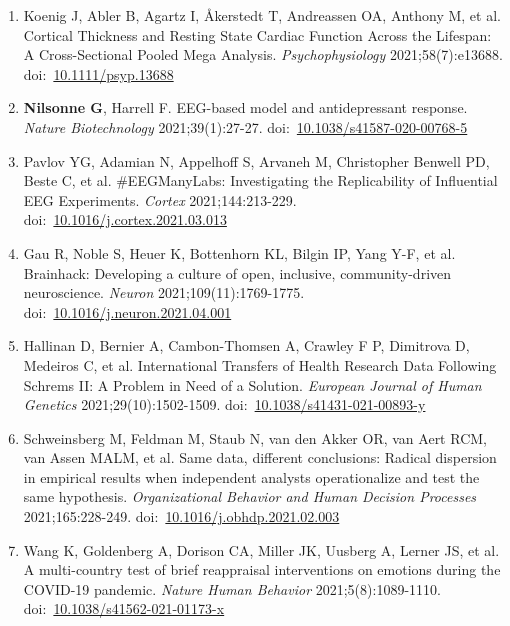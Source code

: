 \documentclass[11pt,a4paper]{article}
\begin{document}
\begin{enumerate}
\item Koenig J, Abler B, Agartz I, Åkerstedt T, Andreassen OA, Anthony M, et al. Cortical Thickness and Resting State Cardiac Function Across the Lifespan: A Cross-Sectional Pooled Mega Analysis. \textit{Psychophysiology} 2021;58(7):e13688. doi:~\href{https://doi.org/10.1111/psyp.13688}{10.1111/psyp.13688}

\item \textbf{Nilsonne G}, Harrell F. EEG-based model and antidepressant response. \textit{Nature Biotechnology} 2021;39(1):27-27. doi:~\href{https://doi.org/10.1038/s41587-020-00768-5}{10.1038/s41587-020-00768-5}

\item Pavlov YG, Adamian N, Appelhoff S, Arvaneh M, Christopher Benwell PD, Beste C, et al. \#EEGManyLabs: Investigating the Replicability of Influential EEG Experiments. \textit{Cortex} 2021;144:213-229. doi:~\href{https://doi.org/10.1016/j.cortex.2021.03.013}{10.1016/j.cortex.2021.03.013}

\item Gau R, Noble S, Heuer K, Bottenhorn KL, Bilgin IP, Yang Y-F, et al. Brainhack: Developing a culture of open, inclusive, community-driven neuroscience. \textit{Neuron} 2021;109(11):1769-1775. doi:~\href{https://doi.org/10.1016/j.neuron.2021.04.001}{10.1016/j.neuron.2021.04.001}

\item Hallinan D, Bernier A, Cambon-Thomsen A, Crawley F P, Dimitrova D, Medeiros C, et al. International Transfers of Health Research Data Following Schrems II: A Problem in Need of a Solution. \textit{European Journal of Human Genetics} 2021;29(10):1502-1509. doi:~\href{https://doi.org/10.1038/s41431-021-00893-y}{10.1038/s41431-021-00893-y}

\item Schweinsberg M, Feldman M, Staub N, van den Akker OR, van Aert RCM, van Assen MALM, et al. Same data, different conclusions: Radical dispersion in empirical results when independent analysts operationalize and test the same hypothesis. \textit{Organizational Behavior and Human Decision Processes} 2021;165:228-249. doi:~\href{https://doi.org/10.1016/j.obhdp.2021.02.003}{10.1016/j.obhdp.2021.02.003}

\item Wang K, Goldenberg A, Dorison CA, Miller JK, Uusberg A, Lerner JS, et al. A multi-country test of brief reappraisal interventions on emotions during the COVID-19 pandemic. \textit{Nature Human Behavior} 2021;5(8):1089-1110. doi:~\href{https://doi.org/10.1038/s41562-021-01173-x}{10.1038/s41562-021-01173-x}


\end{enumerate}
\end{document}
